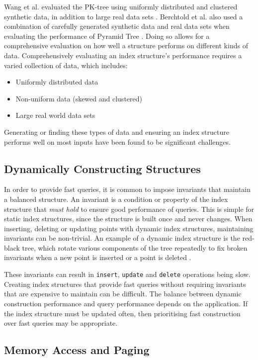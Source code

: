 Wang et al. evaluated the PK-tree using uniformly distributed and clustered synthetic data, in addition to large real data sets \cite{pk-tree}. Berchtold et al. also used a combination of carefully generated synthetic data and real data sets when evaluating the performance of Pyramid Tree \cite{pyramid-tree}. Doing so allows for a comprehensive evaluation on how well a structure performs on different kinds of data.  Comprehensively evaluating an index structure's performance requires a varied collection of data, which includes:
\begin{itemize}
	\item Uniformly distributed data
	\item Non-uniform data (skewed and clustered)
	\item Large real world data sets
\end{itemize}	
Generating or finding these types of data and ensuring an index structure performs well on most inputs have been found to be significant challenges.

\subsection{Dynamically Constructing Structures}

In order to provide fast queries, it is common to impose invariants that maintain a balanced structure. An invariant is a condition or property of the index structure that \textit{must hold} to ensure good performance of queries. This is simple for static index structures, since the structure is built once and never changes. When inserting, deleting or updating points with dynamic index structures, maintaining invariants can be non-trivial. An example of a dynamic index structure is the red-black tree, which rotate various components of the tree repeatedly to fix broken invariants when a new point is inserted or a point is deleted \cite{introduction-to-algorithms}.

These invariants can result in \texttt{insert}, \texttt{update} and \texttt{delete} operations being slow. Creating index structures that provide fast queries without requiring invariants that are expensive to maintain can be difficult. The balance between dynamic construction performance and query performance depends on the application. If the index structure must be updated often, then prioritising fast construction over fast queries may be appropriate.

\subsection{Memory Access and Paging}
\label{sec:paging}

